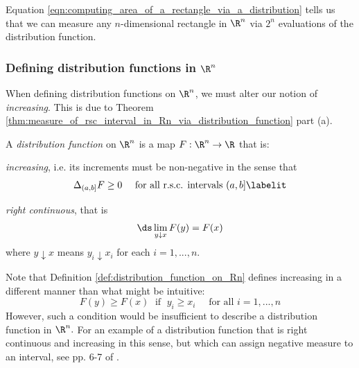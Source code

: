 \documentclass{article} %
\begin{document}
\begin{remark}
Equation \eqref{eqn:computing_area_of_a_rectangle_via_a_distribution} tells us that we can measure any $n$-dimensional rectangle in $\R^n$ via $2^n$ evaluations of the distribution function. 
\end{remark}


\subsubsection{Defining distribution functions in $\R^n$}

When defining distribution functions on $\R^n$,  we must alter our notion of \textit{increasing}.     This is due to Theorem \ref{thm:measure_of_rsc_interval_in_Rn_via_distribution_function} part (a).

\begin{definition}
 A \textit{distribution function} on $\R^n$ is a map $F : \R^n \to \R$ that is:
 
 \begin{alphabate}
 \item \textit{increasing}, i.e. its increments must be non-negative in the sense that
 \begin{align*}
 \Delta_{(a,b]} F \geq 0 \quad \text{ for all r.s.c. intervals $(a,b]$}
 \labelit \label{eqn:increasing_condition_for_distribution_functions_on_Rn}
 \end{align*}



 \item \textit{right continuous}, that is
 \[ \ds\lim_{y \downarrow x} F(y) = F(x) \]
 where $y \downarrow x$ means $y_i \downarrow x_i$ for each $i=1,...,n$.
 \end{alphabate}
 \label{def:distribution_function_on_Rn}
 \end{definition}
 
 \begin{remark}
 Note that Definition \ref{def:distribution_function_on_Rn} defines increasing in a different manner than what might be intuitive:
 \[ F(y) \geq F(x) \; \text { if } \; y_i \geq x_i \quad \text{ for all } i=1,...,n\]
 However, such a condition would be insufficient to describe a distribution function in $\R^n.$ For an example of a distribution function that is right continuous and increasing in this sense, but which can assign negative measure to an interval, see pp. 6-7 of \cite{durrett2010probability}.
 \end{remark}
\end{document}
